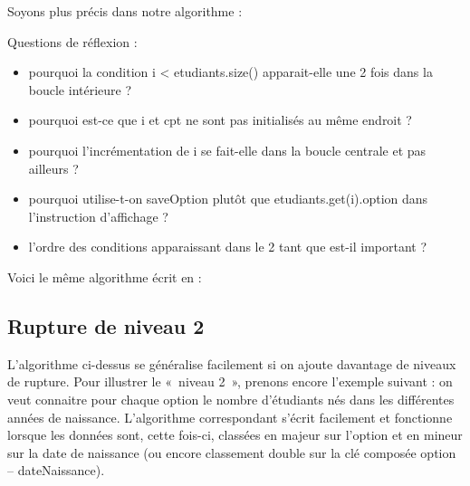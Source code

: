 	\newpage
	Soyons plus précis dans notre algorithme :

	\begin{algo}
		\label{algo:rupt1}
	\end{algo}

	\medskip
	Questions de réflexion :
	\begin{itemize}
		\item 
			pourquoi la condition \textsf{i < etudiants.size()}
			apparait-elle une 2\ieme{} fois dans la boucle intérieure ?
		\item 
			pourquoi est-ce que \textsf{i} et \textsf{cpt} 
			ne sont pas initialisés au même endroit ?
		\item 
			pourquoi l'incrémentation de \textsf{i} se fait-elle dans la boucle centrale 
			et pas ailleurs ?
		\item 
			pourquoi utilise-t-on 
			\textsf{saveOption} plutôt que \textsf{etudiants.get(i).option}
			dans l’instruction d’affichage ?
		\item 
			l’ordre des conditions apparaissant dans le 2\ieme{} \og{}tant que\fg{} 
			est-il important ?
	\end{itemize}

	Voici le même algorithme écrit en  :

\subsection*{Rupture de niveau 2}

	L’algorithme ci-dessus se généralise facilement si on ajoute davantage de niveaux de rupture. 
	Pour illustrer le «~niveau 2~», prenons encore l’exemple suivant : 
	on veut connaitre pour chaque option le nombre d’étudiants nés dans les différentes années de naissance. 
	L’algorithme correspondant s’écrit facilement et fonctionne lorsque les données sont, cette fois-ci,
	classées en majeur sur l'option et en mineur sur la date de naissance
	(ou encore classement double sur la clé composée option – dateNaissance).

